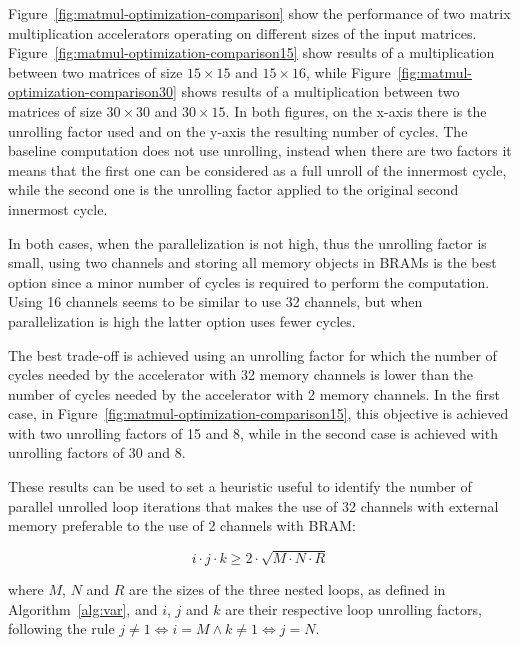 Figure~\ref{fig:matmul-optimization-comparison} show the performance of two matrix multiplication accelerators operating on different sizes of the input matrices.
Figure~\ref{fig:matmul-optimization-comparison15} show results of a multiplication between two matrices of size $15\times15$ and $15\times16$, while Figure~\ref{fig:matmul-optimization-comparison30} shows results of a multiplication between two matrices of size $30\times30$ and $30\times15$.
In both figures, on the x-axis there is the unrolling factor used and on the y-axis the resulting number of cycles.
The baseline computation does not use unrolling, instead when there are two factors it means that the first one can be considered as a full unroll of the innermost cycle, while the second one is the unrolling factor applied to the original second innermost cycle.

In both cases, when the parallelization is not high, thus the unrolling factor is small, using two channels and storing all memory objects in BRAMs is the best option since a minor number of cycles is required to perform the computation.
Using 16 channels seems to be similar to use 32 channels, but when parallelization is high the latter option uses fewer cycles.

The best trade-off is achieved using an unrolling factor for which the number of cycles needed by the accelerator with 32 memory channels is lower than the number of cycles needed by the accelerator with 2 memory channels.
In the first case, in Figure~\ref{fig:matmul-optimization-comparison15}, this objective is achieved with two unrolling factors of 15 and 8, while in the second case is achieved with unrolling factors of 30 and 8.

These results can be used to set a heuristic useful to identify the number of parallel unrolled loop iterations that makes the use of 32 channels with external memory preferable to the use of 2 channels with BRAM:

\begin{equation}
    \label{eq:factor-relation}
        i \cdot j \cdot k \geq 2 \cdot \sqrt {M \cdot N \cdot R}
\end{equation}

where $M$, $N$ and $R$ are the sizes of the three nested loops, as defined in Algorithm~\ref{alg:var}, and $i$, $j$ and $k$ are their respective loop unrolling factors, following the rule $j \neq 1 \iff i=M \land k \neq 1 \iff j=N$.

